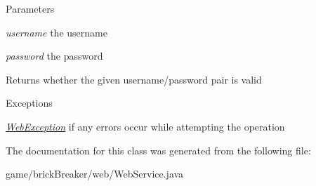 \begin{DoxyParams}{Parameters}
\item[{\em username}]the username \item[{\em password}]the password \end{DoxyParams}
\begin{DoxyReturn}{Returns}
whether the given username/password pair is valid
\end{DoxyReturn}

\begin{DoxyExceptions}{Exceptions}
\item[{\em \hyperlink{classbrick_breaker_1_1web_1_1_web_exception}{WebException}}]if any errors occur while attempting the operation \end{DoxyExceptions}


The documentation for this class was generated from the following file:\begin{DoxyCompactItemize}
\item 
game/brickBreaker/web/WebService.java\end{DoxyCompactItemize}
